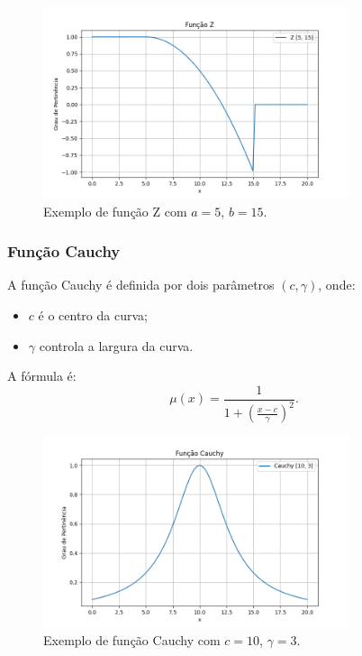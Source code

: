 \documentclass[a4paper,12pt]{article}
\begin{document}
\begin{figure}[H]
    \centering
    \includegraphics[width=0.8\textwidth]{img/z.png}
    \caption{Exemplo de função Z com $a=5$, $b=15$.}
    \label{fig:funcao_z}
\end{figure}

\subsubsection{Função Cauchy}
A função Cauchy é definida por dois parâmetros $(c, \gamma)$, onde:
\begin{itemize}
    \item $c$ é o centro da curva;
    \item $\gamma$ controla a largura da curva.
\end{itemize}
A fórmula é:
\[
\mu(x) = \frac{1}{1 + \left(\frac{x - c}{\gamma}\right)^2}.
\]
\begin{figure}[H]
    \centering
    \includegraphics[width=0.8\textwidth]{img/cauchy.png}
    \caption{Exemplo de função Cauchy com $c=10$, $\gamma=3$.}
    \label{fig:funcao_cauchy}
\end{figure}
\end{document}
